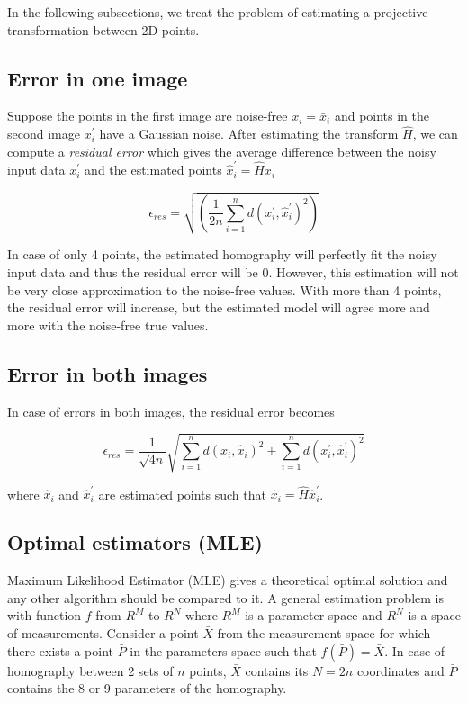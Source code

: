 In the following subsections, we treat the problem of estimating a projective transformation between 2D points.

\subsection{Error in one image}

Suppose the points in the first image are noise-free $x_i = \bar{x}_i$ and points in the second image $x^\prime_i$ have a Gaussian noise. After estimating the transform $\hat{H}$, we can compute a \textit{residual error} which gives the average difference between the noisy input data $x^\prime_i$ and the 
estimated points $\hat{x}^\prime_i = \hat{H}\bar{x}_i$

\begin{equation}
    \epsilon_{res} = \sqrt{\left( \frac{1}{2n}\sum_{i=1}^{n} d(x^\prime_i,\hat{x}^\prime_i)^2 \right)}
\end{equation}{}

In case of only 4 points, the estimated homography will perfectly fit the noisy input data and thus the residual error will be 0. However, this estimation will not be very close approximation to the noise-free values.
With more than 4 points, the residual error will increase, but the estimated model will agree more and more with the noise-free true values.

\subsection{Error in both images}
In case of errors in both images, the residual error becomes

\begin{equation}
    \epsilon_{res} = \frac{1}{\sqrt{4n}} \sqrt{\sum_{i=1}^{n} d(x_i, \hat{x}_i)^2 + \sum_{i=1}^{n} d(x^\prime_i, \hat{x}^\prime_i)^2}
\end{equation}{}

where $\hat{x}_i$ and $\hat{x}_i^\prime$ are estimated points such that $\hat{x}_i = \hat{H} \hat{x}_i^\prime$.


\subsection{Optimal estimators (MLE)}
Maximum Likelihood Estimator (MLE) gives a theoretical optimal solution and any other algorithm should be compared to it.
A general estimation problem is with function $f$ from $R^M$ to $R^N$ where $R^M$ is a parameter space and $R^N$ is a space of measurements. Consider a point $\bar{X}$ from the measurement space for which there exists a point $\bar{P}$ in the parameters space such that $f(\bar{P}) = \bar{X}$. In case of homography between 2 sets of $n$ points, $\bar{X}$ contains its $N=2n$ coordinates and $\bar{P}$ contains the 8 or 9 parameters of the homography.

